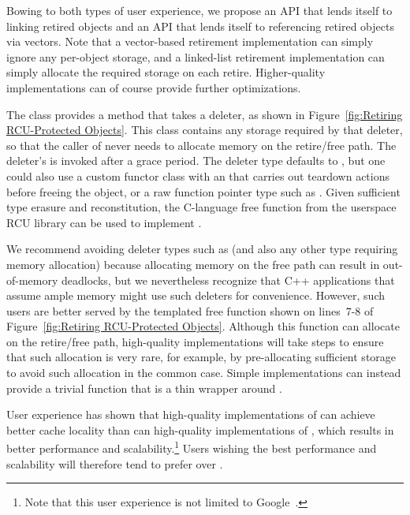 \documentclass[letterpaper,10pt]{article}
\begin{document}
Bowing to both types of user experience, we propose an API that
lends itself to linking retired objects and an API that lends
itself to referencing retired objects via vectors.
Note that a vector-based retirement implementation can simply ignore
any per-object storage, and a linked-list retirement implementation
can simply allocate the required storage on each retire.
Higher-quality implementations can of course provide further optimizations.

The  class provides a  method that
takes a deleter,
as shown in
Figure~\ref{fig:Retiring RCU-Protected Objects}.
This class contains any storage required by that deleter, so that
the caller of
 never needs to allocate
memory on the retire/free path.
The deleter's  is invoked after a grace period.
The deleter type defaults to ,
but one could also use a
custom functor class with an  that carries out teardown actions
before freeing the object, or a raw function pointer type such as
.
Given sufficient type erasure and reconstitution, the 
C-language free function from the userspace RCU library can be used to
implement .

We recommend avoiding deleter types such as 
(and also any other type requiring memory allocation) because
allocating memory on the free path can result in out-of-memory deadlocks,
but we nevertheless recognize that C++ applications that assume ample
memory might use such deleters for convenience.
However, such users are better served by the 
templated free function shown on lines~7-8 of
Figure~\ref{fig:Retiring RCU-Protected Objects}.
Although this function can allocate on the retire/free path, high-quality
implementations will take steps to ensure that such allocation is very
rare, for example, by pre-allocating sufficient storage to avoid
such allocation in the common case.
Simple implementations can instead provide a trivial 
function that is a thin wrapper around .

User experience has shown that high-quality implementations
of  can achieve better cache locality than can 
high-quality implementations of ,
which results in better performance and
scalability.\footnote{
	Note that this user experience is not limited to
	Google~\cite{MathieuDesnoyers2012URCU}.}
Users wishing the best performance and scalability will therefore tend
to prefer  over .
\end{document}
